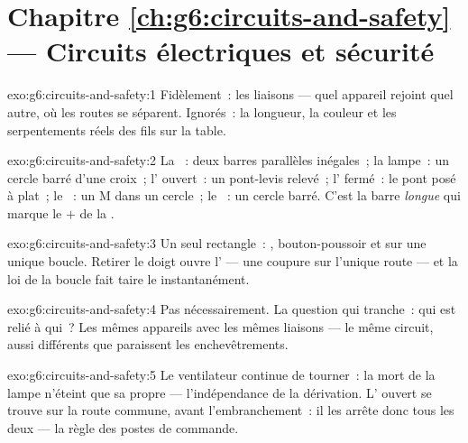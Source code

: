 \section*{Chapitre \ref{ch:g6:circuits-and-safety} --- Circuits électriques et sécurité}

\begin{solution}{exo:g6:circuits-and-safety:1}
Fidèlement~: les liaisons --- quel appareil rejoint quel autre, où
les routes se séparent. Ignorés~: la longueur, la couleur et les
serpentements réels des fils sur la table.
\end{solution}

\begin{solution}{exo:g6:circuits-and-safety:2}
La ~: deux barres parallèles inégales~; la lampe~: un cercle
barré d'une croix~; l' ouvert~: un pont-levis relevé~;
l' fermé~: le pont posé à plat~; le ~: un M dans un
cercle~; le ~: un cercle barré. C'est la barre \emph{longue}
qui marque le $+$ de la .
\end{solution}

\begin{solution}{exo:g6:circuits-and-safety:3}
Un seul rectangle~: , bouton-poussoir et  sur une unique
boucle. Retirer le doigt ouvre l' --- une coupure sur
l'unique route --- et la loi de la boucle fait taire le 
instantanément.
\end{solution}

\begin{solution}{exo:g6:circuits-and-safety:4}
Pas nécessairement. La question qui tranche~: qui est relié à qui~?
Les mêmes appareils avec les mêmes liaisons --- le même circuit,
aussi différents que paraissent les enchevêtrements.
\end{solution}

\begin{solution}{exo:g6:circuits-and-safety:5}
Le ventilateur continue de tourner~: la mort de la lampe n'éteint que
sa propre  --- l'indépendance de la dérivation.
L' ouvert se trouve sur la route commune, avant
l'embranchement~: il les arrête donc tous les deux --- la règle des
postes de commande.
\end{solution}

